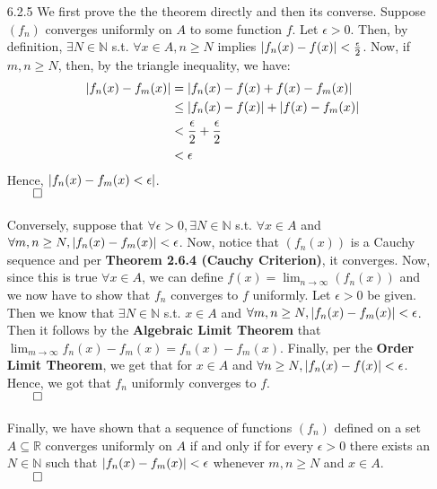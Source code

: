 \documentclass[11pt]{article}
\DeclarePairedDelimiter\abs{\lvert}{\rvert}%
\newcommand{\nats}{\mathbb{N}}
\newcommand{\reals}{\mathbb{R}}
\begin{document}
\begin{itemize}
    \item[6.2.5]
        We first prove the the theorem directly and then its converse. Suppose
        $(f_n)$ converges uniformly on $A$ to some function $f$. Let $\epsilon
        > 0$. Then, by definition, $\exists N \in \nats$ s.t. $\forall x \in A,
        n \geq N$ implies $\abs{f_n(x) - f(x)} < \frac{\epsilon}{2}$. Now, if
        $m, n \geq N$, then, by the triangle inequality, we have:
        \begin{align*}
            \abs{f_n(x) - f_m(x)}
                &= \abs{f_n(x) - f(x) + f(x) - f_m(x)}\\
                &\leq \abs{f_n(x) - f(x)} + \abs{f(x) - f_m(x)}\\
                &< \frac{\epsilon}{2} + \frac{\epsilon}{2}\\
                &< \epsilon
        \end{align*}
        Hence, $\abs{f_n(x) - f_m(x) < \epsilon}$.\\
        $\qed$
        \\
        \\
        Conversely, suppose that $\forall \epsilon > 0, \exists N \in \nats$
        s.t. $\forall x \in A$ and $\forall m, n \geq N, \abs{f_n(x) - f_m(x)}
        < \epsilon$. Now, notice that $(f_n(x))$ is a Cauchy sequence and per
        \textbf{Theorem 2.6.4 (Cauchy Criterion)}, it converges. Now, since
        this is true $\forall x \in A$, we can define $f(x) = \lim_{n \to
        \infty}(f_n(x))$ and we now have to show that $f_n$ converges to $f$
        uniformly. Let $\epsilon > 0$ be given. Then we know that $\exists N
        \in \nats$ s.t. $x \in A$ and $\forall m, n \geq N, \abs{ f_n(x) -
        f_m(x)} < \epsilon$. Then it follows by the \textbf{Algebraic Limit
        Theorem} that $\lim_{m \to \infty}{f_n(x) - f_m(x)} = f_n(x) - f_m(x)$.
        Finally, per the \textbf{Order Limit Theorem}, we get that for $x \in
        A$ and $\forall n \geq N, \abs{f_n(x) - f(x)} < \epsilon$. Hence, we
        got that $f_n$ uniformly converges to $f$.\\
        $\qed$
        \\
        \\
        Finally, we have shown that a sequence of functions $(f_n)$ defined on
        a set $A \subseteq \reals$ converges uniformly on $A$ if and only if
        for every $\epsilon > 0$ there exists an $N \in \nats$ such that
        $\abs{f_n(x) - f_m(x)} < \epsilon$ whenever $m, n \geq N$ and $x \in
        A$.\\
        $\qed$


\end{itemize}
\end{document}

